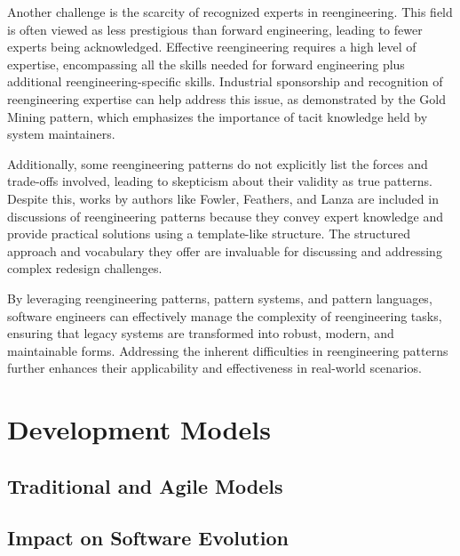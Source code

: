 Another challenge is the scarcity of recognized experts in reengineering. This field is often viewed as less prestigious than forward engineering, leading to fewer experts being acknowledged. Effective reengineering requires a high level of expertise, encompassing all the skills needed for forward engineering plus additional reengineering-specific skills. Industrial sponsorship and recognition of reengineering expertise can help address this issue, as demonstrated by the Gold Mining pattern, which emphasizes the importance of tacit knowledge held by system maintainers.

Additionally, some reengineering patterns do not explicitly list the forces and trade-offs involved, leading to skepticism about their validity as true patterns. Despite this, works by authors like Fowler, Feathers, and Lanza are included in discussions of reengineering patterns because they convey expert knowledge and provide practical solutions using a template-like structure. The structured approach and vocabulary they offer are invaluable for discussing and addressing complex redesign challenges.

By leveraging reengineering patterns, pattern systems, and pattern languages, software engineers can effectively manage the complexity of reengineering tasks, ensuring that legacy systems are transformed into robust, modern, and maintainable forms. Addressing the inherent difficulties in reengineering patterns further enhances their applicability and effectiveness in real-world scenarios.



\section{Development Models}
\cite{DevelopmentModels2010}
\cite{ContinuousEngineering2017}

\subsection{Traditional and Agile Models}

\subsection{Impact on Software Evolution}
